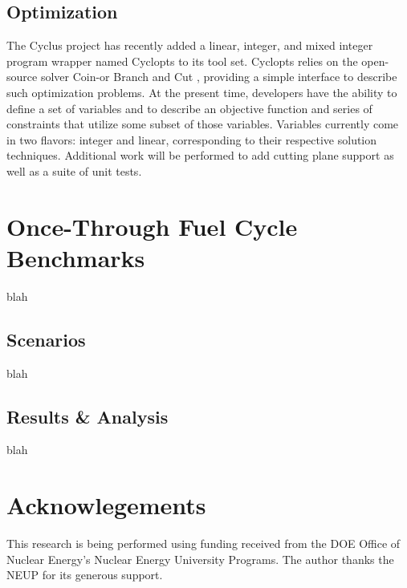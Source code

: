 \documentclass{anstrans}
\begin{document}
\subsection{Optimization}
The Cyclus project has recently added a linear, integer, and mixed integer program wrapper named Cyclopts \cite{cyclopts2012} to its tool set. Cyclopts relies on the
open-source solver Coin-or Branch and Cut \cite{coinCBC}, providing a simple interface to describe such optimization problems. At the present time,
developers have the ability to define a set of variables and to describe an objective function and series of constraints that utilize some subset
of those variables. Variables currently come in two flavors: integer and linear, corresponding to their respective solution techniques. Additional
work will be performed to add cutting plane support as well as a suite of unit tests.
\section{Once-Through Fuel Cycle Benchmarks}
blah
\subsection{Scenarios}
blah
\subsection{Results \& Analysis}
blah
\section{Acknowlegements}
This research is being performed using funding received from the DOE Office of Nuclear Energy's Nuclear Energy University Programs. 
The author thanks the NEUP for its generous support.

\end{document}
